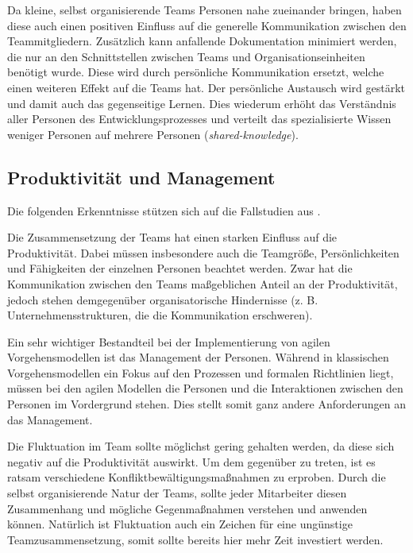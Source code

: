 Da kleine, selbst organisierende Teams Personen nahe zueinander bringen, haben diese auch einen positiven Einfluss auf die generelle Kommunikation zwischen den Teammitgliedern.
Zusätzlich kann anfallende Dokumentation minimiert werden, die nur an den Schnittstellen zwischen Teams und Organisationseinheiten benötigt wurde.
Diese wird durch persönliche Kommunikation ersetzt, welche einen weiteren Effekt auf die Teams hat. 
Der persönliche Austausch wird gestärkt und damit auch das gegenseitige Lernen.
Dies wiederum erhöht das Verständnis aller Personen des Entwicklungsprozesses und verteilt das spezialisierte Wissen weniger Personen auf mehrere Personen (\emph{shared-knowledge}).
\parencite[Vgl.][S. 685]{Petersen:2010aa}

\subsection{Produktivität und Management} %

Die folgenden Erkenntnisse stützen sich auf die Fallstudien aus \parencite[][S. 418 f.]{DeO.Melo:2013:ICS:2400747.2401010}.

Die Zusammensetzung der Teams hat einen starken Einfluss auf die Produktivität.
Dabei müssen insbesondere auch die Teamgröße, Persönlichkeiten und Fähigkeiten der einzelnen Personen beachtet werden.
Zwar hat die Kommunikation zwischen den Teams maßgeblichen Anteil an der Produktivität, jedoch stehen demgegenüber organisatorische Hindernisse (z. B. Unternehmensstrukturen, die die Kommunikation erschweren).

Ein sehr wichtiger Bestandteil bei der Implementierung von agilen Vorgehensmodellen ist das Management der Personen.
Während in klassischen Vorgehensmodellen ein Fokus auf den Prozessen und formalen Richtlinien liegt, müssen bei den agilen Modellen die Personen und die Interaktionen zwischen den Personen im Vordergrund stehen.
Dies stellt somit ganz andere Anforderungen an das Management.

Die Fluktuation im Team sollte möglichst gering gehalten werden, da diese sich negativ auf die Produktivität auswirkt. 
Um dem gegenüber zu treten, ist es ratsam verschiedene Konfliktbewältigungsmaßnahmen zu erproben.
Durch die selbst organisierende Natur der Teams, sollte jeder Mitarbeiter diesen Zusammenhang und mögliche Gegenmaßnahmen verstehen und anwenden können.
Natürlich ist Fluktuation auch ein Zeichen für eine ungünstige Teamzusammensetzung, somit sollte bereits hier mehr Zeit investiert werden.

